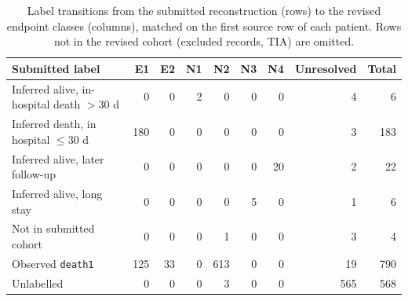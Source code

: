 \begin{table}[htbp]\centering\scriptsize
\caption{Label transitions from the submitted reconstruction (rows) to the revised endpoint classes (columns), matched on the first source row of each patient. Rows not in the revised cohort (excluded records, TIA) are omitted.}\label{tab:transitions}
\begin{tabular}{lrrrrrrrr}
\toprule
Submitted label & E1 & E2 & N1 & N2 & N3 & N4 & Unresolved & Total \\
\midrule
Inferred alive, in-hospital death $>$30 d & 0 & 0 & 2 & 0 & 0 & 0 & 4 & 6 \\
Inferred death, in hospital $\le$30 d & 180 & 0 & 0 & 0 & 0 & 0 & 3 & 183 \\
Inferred alive, later follow-up & 0 & 0 & 0 & 0 & 0 & 20 & 2 & 22 \\
Inferred alive, long stay & 0 & 0 & 0 & 0 & 5 & 0 & 1 & 6 \\
Not in submitted cohort & 0 & 0 & 0 & 1 & 0 & 0 & 3 & 4 \\
Observed \texttt{death1} & 125 & 33 & 0 & 613 & 0 & 0 & 19 & 790 \\
Unlabelled & 0 & 0 & 0 & 3 & 0 & 0 & 565 & 568 \\
\bottomrule
\end{tabular}
\end{table}
